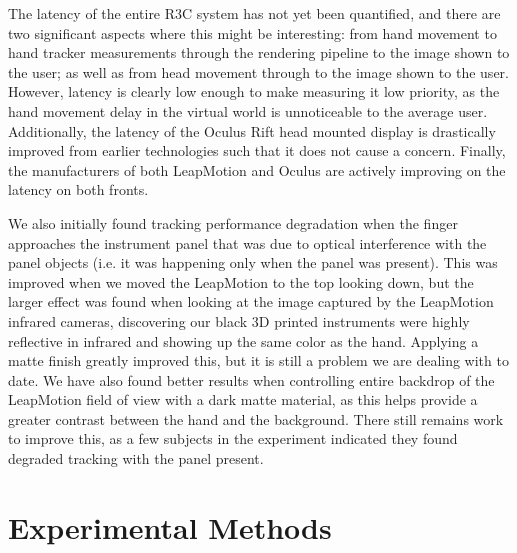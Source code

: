 The latency of the entire R3C system has not yet been quantified, and there are two significant aspects where this might be interesting: from hand movement to hand tracker measurements through the rendering pipeline to the image shown to the user; as well as from head movement through to the image shown to the user.
However, latency is clearly low enough to make measuring it low priority, as the hand movement delay in the virtual world is unnoticeable to the average user.
Additionally, the latency of the Oculus Rift head mounted display is drastically improved from earlier technologies such that it does not cause a concern.
Finally, the manufacturers of both LeapMotion and Oculus are actively improving on the latency on both fronts.

We also initially found tracking performance degradation when the finger approaches the instrument panel that was due to optical interference with the panel objects (i.e.
it was happening only when the panel was present).
This was improved when we moved the LeapMotion to the top looking down, but the larger effect was found when looking at the image captured by the LeapMotion infrared cameras, discovering our black 3D printed instruments were highly reflective in infrared and showing up the same color as the hand.
Applying a matte finish greatly improved this, but it is still a problem we are dealing with to date.
We have also found better results when controlling entire backdrop of the LeapMotion field of view with a dark matte material, as this helps provide a greater contrast between the hand and the background.
There still remains work to improve this, as a few subjects in the experiment indicated they found degraded tracking with the panel present.

\section{Experimental Methods}

